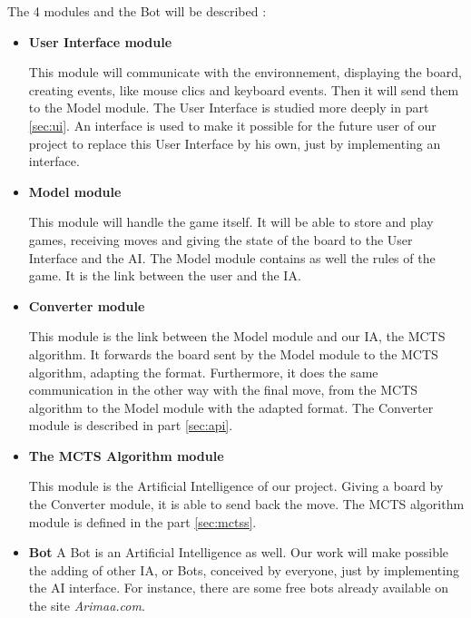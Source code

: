 The 4 modules and the Bot will be described :

\begin{itemize}
\item \textbf{User Interface module}

This module will communicate with the environnement, displaying the board, creating events, like mouse clics and keyboard events. Then it will send them to the Model module. The User Interface is studied more deeply in part \ref{sec:ui}. An interface is used to make it possible for the future user of our project to replace this User Interface by his own, just by implementing an interface.

\item \textbf{Model module}

This module will handle the game itself. It will be able to store and play games, receiving moves and giving the state of the board to the User Interface and the AI. The Model module contains as well the rules of the game. It is the link between the user and the IA.

\item \textbf{Converter module}

This module is the link between the Model module and our IA, the MCTS algorithm. It forwards the board sent by the Model module to the MCTS algorithm, adapting the format. Furthermore, it does the same communication in the other way with the final move, from the MCTS algorithm to the Model module with the adapted format. The Converter module is described in part \ref{sec:api}.

\item \textbf{The MCTS Algorithm module}

This module is the Artificial Intelligence of our project. Giving a board by the Converter module, it is able to send back the move. The MCTS algorithm module is defined in the part \ref{sec:mctss}.

\item \textbf{Bot}
A Bot is an Artificial Intelligence as well. Our work will make possible the adding of other IA, or Bots, conceived by everyone, just by implementing the AI interface. For instance, there are some free bots already available on the site \textit{Arimaa.com}.
\end{itemize}